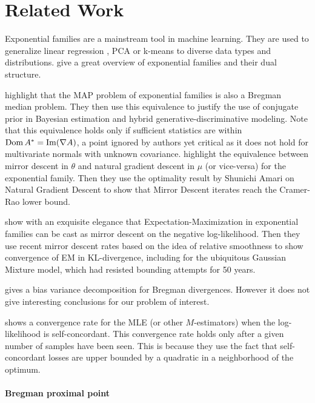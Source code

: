 \documentclass{article}
\newcommand{\logpart}{A}
\newcommand{\conj}{\logpart^*}
\newcommand{\natp}{\theta}
\newcommand{\meanp}{\mu}
\begin{document}
\section{Related Work}
Exponential families are a mainstream tool in machine learning. They are used  to generalize linear regression \citep{mccullagh1989generalized}, PCA \citep{collins2001generalization} or k-means \citep{banerjee2005clustering} to diverse data types and distributions.
\citet[Chapter 3]{wainwright2008graphical} give a great overview of exponential families and their dual structure. 

\citet{agarwal2010geometric} highlight that the MAP problem of exponential families is also a Bregman median problem. They then use this equivalence to justify the use of conjugate prior in Bayesian estimation and hybrid generative-discriminative modeling.
Note that this equivalence holds only if sufficient statistics are within $\dom \conj  = \mathrm{Im} (\nabla\logpart)$, a point ignored by authors yet critical as it does not hold for multivariate normals with unknown covariance. 
\citet{raskutti2015information} highlight the equivalence between mirror descent in $\natp$ and natural gradient descent in $\meanp$ (or vice-versa) for the exponential family. Then they use the optimality result by Shunichi Amari on Natural Gradient Descent to show that Mirror Descent iterates reach the Cramer-Rao lower bound.

\citet{kunstner2020homeomorphic} show with an exquisite elegance that Expectation-Maximization in exponential families can be cast as mirror descent on the negative log-likelihood. Then they use recent mirror descent rates based on the idea of relative smoothness \citep{birnbaum2011distributed, bauschke2017descent, lu2018relatively} to show convergence of EM in KL-divergence, including for the ubiquitous Gaussian Mixture model, which had resisted bounding attempts for 50 years.

\citet{pfau2013generalized} gives a bias variance decomposition for Bregman divergences. However it does not give interesting conclusions for our problem of interest.

\citet{ostrovskii2021finite}  shows a convergence rate for the MLE (or other $M$-estimators)   when  the log-likelihood is self-concordant. This convergence rate holds only after a given number of samples have been seen. This is because they use the fact that self-concordant losses are upper bounded by a quadratic in a neighborhood of the optimum. 

\paragraph{Bregman proximal point}
\end{document}
